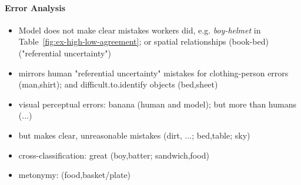 \iffalse
\begin{itemize}
	\item VG worse than MN; considering that model was trained on VG - is it because MN has easier labels? Does this mean that generalisation ability is better evaluated on MN?
	\item VG!=MN-1 much worse than All $\Rightarrow$ Former has more difficult/ambiguous images (for both? classifier and human?)
	\item for those more difficult images (VG!=MN-1), the difference for multi-label is much lower to All (columns inMN) $\Rightarrow$ MN provides a more robust evaluation framework; highest drop in food domain
	\item accuracy drops for notTrain (except for vehicles MN-1), but is still much better than VG!=MN-1  
\end{itemize}
\fi 
\paragraph{Error Analysis}
\begin{itemize}
	\item Model does not make clear mistakes workers did, e.g. \textsl{boy-helmet} in Table\ \ref{fig:ex-high-low-agreement}; or spatial relationships (book-bed) ("referential uncertainty")
	\item mirrors human "referential uncertainty" mistakes for clothing-person errors (man,shirt); and difficult.to.identify objects (bed,sheet)
	\item visual perceptual errors: banana (human and model); but more than humans (...)
	\item but makes clear, unreasonable mistakes (dirt, ...; bed,table; sky)
	\item cross-classification: great (boy,batter; sandwich,food)
	\item metonymy: (food,basket/plate)
\end{itemize}